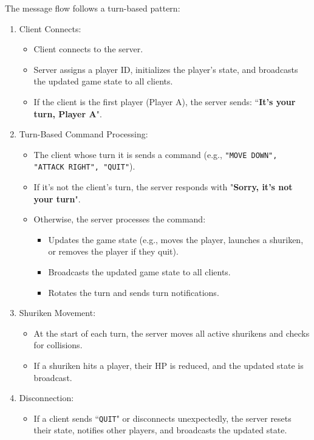 \documentclass{article}
\begin{document}
\begin{enumerate}
    The message flow follows a turn-based pattern:
    \begin{enumerate}
        \item Client Connects:
            \begin{itemize}
                \item Client connects to the server.
                \item Server assigns a player ID, initializes the player's state, and broadcasts the updated game state to all clients.
                \item If the client is the first player (Player A), the server sends: ``\textbf{It's your turn, Player A}".
            \end{itemize}
        \item Turn-Based Command Processing:
            \begin{itemize}
                \item The client whose turn it is sends a command (e.g., \texttt{"MOVE DOWN", "ATTACK RIGHT", "QUIT"}).
                \item If it's not the client's turn, the server responds with "\textbf{Sorry, it's not your turn}".
                \item Otherwise, the server processes the command:
                    \begin{itemize}
                        \item Updates the game state (e.g., moves the player, launches a shuriken, or removes the player if they quit).
                        \item Broadcasts the updated game state to all clients.
                        \item Rotates the turn and sends turn notifications.
                    \end{itemize}
            \end{itemize}
        \item Shuriken Movement:
            \begin{itemize}
                \item At the start of each turn, the server moves all active shurikens and checks for collisions.
                \item If a shuriken hits a player, their HP is reduced, and the updated state is broadcast.
            \end{itemize}
        \item Disconnection:
            \begin{itemize}
                \item If a client sends ``\texttt{QUIT}" or disconnects unexpectedly, the server resets their state, notifies other players, and broadcasts the updated state.
            \end{itemize}
    \end{enumerate}
\end{enumerate}
\end{document}
